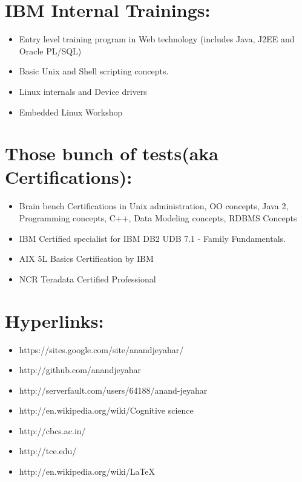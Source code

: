 \section {IBM Internal Trainings:}
	\begin {itemize}

		\item Entry level training program in Web technology (includes Java, J2EE and Oracle PL/SQL)

		\item Basic Unix and Shell scripting concepts.

		\item Linux internals and Device drivers
		\item Embedded Linux Workshop
	\end {itemize}

\section {Those bunch of tests(aka Certifications):}
	\begin {itemize}

		\item Brain bench Certifications in Unix administration, OO concepts, Java 2, Programming concepts, C++, Data Modeling concepts, RDBMS Concepts

		\item IBM Certified specialist for IBM DB2 UDB 7.1 - Family Fundamentals.

		\item AIX 5L Basics Certification by IBM

		\item NCR Teradata Certified Professional
	\end {itemize}

\section {Hyperlinks:}
	\begin {itemize}

		\item https://sites.google.com/site/anandjeyahar/

		\item http://github.com/anandjeyahar



		\item http://serverfault.com/users/64188/anand-jeyahar

		\item http://en.wikipedia.org/wiki/Cognitive science

		\item http://cbcs.ac.in/

		\item http://tce.edu/

		\item http://en.wikipedia.org/wiki/LaTeX

	\end{itemize}

